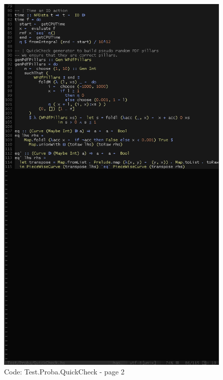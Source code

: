 \documentclass[12pt,a4paper,titlepage]{article}
\begin{document}
\begin{figure}[h!]
\centering
\includegraphics[width=1\textwidth]{img/code-test-quickcheck-2.png}
\caption{Code: Test.Proba.QuickCheck - page 2}
\label{fig:test.qc2}
\end{figure}
\end{document}
